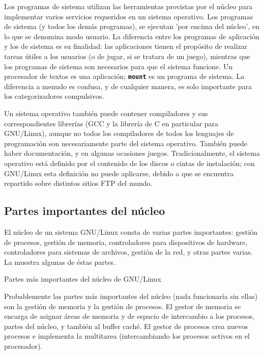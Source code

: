 \documentclass[12pt]{article}
\begin{document}
\begin{}
 Los programas de sistema utilizan las herramientas provistas por el
núcleo para implementar varios servicios requeridos en un sistema operativo. Los
programas de sistema (y todos los demás programas), se ejecutan 'por encima del
núcleo', en lo que se denomina modo usuario. La diferencia entre los programas
de aplicación y los de sistema es su finalidad: las aplicaciones tienen el
propósito de realizar tareas útiles a los usuarios (o de jugar, si se tratara de
un juego), mientras que los programas de sistema son necesarios para que el
sistema funcione. Un procesador de textos es una aplicación;
\texttt{\textbf{mount}} es un programa de sistema. La diferencia a menudo es
confusa, y de cualquier manera, es solo importante para los categorizadores
compulsivos.  

 Un sistema operativo también puede contener compiladores y sus
correspondientes librerías (GCC y la librería de C en particular para
GNU/Linux), aunque no todos los compiladores de todos los lenguajes de
programación son necesariamente parte del sistema operativo. También puede haber
documentación, y en algunas ocasiones juegos. Tradicionalmente, el sistema
operativo está definido por el contenido de los discos o cintas de instalación;
con GNU/Linux esta definición no puede aplicarse, debido a que se encuentra
repartido sobre distintos sitios FTP del mundo.  



\subsection{Partes importantes del núcleo}

El núcleo de un sistema GNU/Linux consta de varias partes importantes:
gestión de procesos, gestión de memoria,  controladores para dispositivos de
hardware, controladores para sistemas de archivos, gestión de la red, y otras
partes varias. La 
muestra algunas de éstas partes.

Partes más importantes del núcleo
de GNU/Linux

 Probablemente las partes más importantes del núcleo (nada funcionaría sin
ellas) son la gestión de memoria y la gestión de procesos. El gestor de memoria
se encarga de asignar áreas de memoria y de espacio de intercambio a los
procesos, partes del núcleo, y también al buffer caché. El gestor de
procesos crea nuevos procesos e implementa la multitarea (intercambiando
los procesos activos en el procesador).


\end{}
\end{document}
